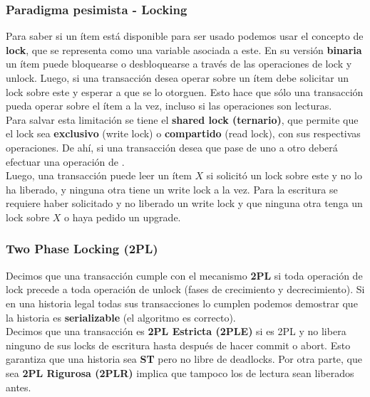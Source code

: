 \subsubsection*{Paradigma pesimista - Locking}
Para saber si un ítem está disponible para ser usado podemos usar el concepto de \textbf{lock}, que se representa como una variable asociada a este. En su versión \textbf{binaria} un ítem puede bloquearse o desbloquearse a través de las operaciones de lock y unlock. Luego, si una transacción desea operar sobre un ítem debe solicitar un lock sobre este y esperar a que se lo otorguen. Esto hace que sólo una transacción pueda operar sobre el ítem a la vez, incluso si las operaciones son lecturas. \\
Para salvar esta limitación se tiene el \textbf{shared lock (ternario)}, que permite que el lock sea \textbf{exclusivo} (write lock) o \textbf{compartido} (read lock), con sus respectivas operaciones. De ahí, si una transacción desea que pase de uno a otro deberá efectuar una operación de . \\
Luego, una transacción puede leer un ítem $X$ si solicitó un lock sobre este y no lo ha liberado, y ninguna otra tiene un write lock a la vez. Para la escritura se requiere haber solicitado y no liberado un write lock y que ninguna otra tenga un lock sobre $X$ o haya pedido un upgrade.

\subsubsection*{Two Phase Locking (2PL)}
Decimos que una transacción cumple con el mecanismo \textbf{2PL} si toda operación de lock precede a toda operación de unlock (fases de crecimiento y decrecimiento). Si en una historia legal todas sus transacciones lo cumplen podemos demostrar que la historia es \textbf{serializable} (el algoritmo es correcto). \\
Decimos que una transacción es \textbf{2PL Estricta (2PLE)} si es 2PL y no libera ninguno de sus locks de escritura hasta después de hacer commit o abort. Esto garantiza que una historia sea \textbf{ST} pero no libre de deadlocks. Por otra parte, que sea \textbf{2PL Rigurosa (2PLR)} implica que tampoco los de lectura sean liberados antes.

